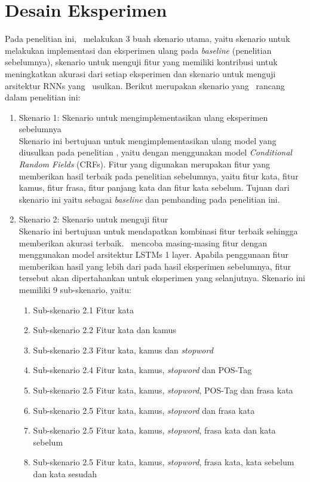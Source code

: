 \section{Desain Eksperimen}
Pada penelitian ini, \saya~melakukan 3 buah skenario utama, yaitu skenario untuk melakukan implementasi dan eksperimen ulang pada \textit{baseline} (penelitian sebelumnya), skenario untuk menguji fitur yang memiliki kontribusi untuk meningkatkan akurasi dari setiap eksperimen dan skenario untuk menguji arsitektur RNNs yang \saya~usulkan. Berikut merupakan skenario yang \saya~rancang dalam penelitian ini:
\begin{enumerate}
	\item Skenario 1: Skenario untuk mengimplementasikan ulang eksperimen sebelumnya\\
	Skenario ini bertujuan untuk mengimplementasikan ulang model yang diusulkan pada penelitian \cite{skripsiKakRadit}, yaitu dengan menggunakan model \textit{Conditional Random Fields} (CRFs). Fitur yang digunakan merupakan fitur yang memberikan hasil terbaik pada penelitian sebelumnya, yaitu fitur kata, fitur kamus, fitur frasa, fitur panjang kata dan fitur kata sebelum. Tujuan dari skenario ini yaitu sebagai \textit{baseline} dan pembanding pada penelitian ini.
	
	\item Skenario 2: Skenario untuk menguji fitur\\
	Skenario ini bertujuan untuk mendapatkan kombinasi fitur terbaik sehingga memberikan akurasi terbaik. \Saya~mencoba masing-masing fitur dengan menggunakan model arsitektur LSTMs 1 layer. Apabila penggunaan fitur memberikan hasil yang lebih dari pada hasil eksperimen sebelumnya, fitur tersebut akan dipertahankan untuk eksperimen yang selanjutnya. Skenario ini memiliki 9 sub-skenario, yaitu:
	\begin{enumerate}
		\item Sub-skenario 2.1 Fitur kata
		\item Sub-skenario 2.2 Fitur kata dan kamus
		\item Sub-skenario 2.3 Fitur kata, kamus dan \textit{stopword}
		\item Sub-skenario 2.4 Fitur kata, kamus, \textit{stopword} dan POS-Tag
		\item Sub-skenario 2.5 Fitur kata, kamus, \textit{stopword}, POS-Tag dan frasa kata
		\item Sub-skenario 2.5 Fitur kata, kamus, \textit{stopword} dan frasa kata
		\item Sub-skenario 2.5 Fitur kata, kamus, \textit{stopword}, frasa kata dan kata sebelum
		\item Sub-skenario 2.5 Fitur kata, kamus, \textit{stopword}, frasa kata, kata sebelum dan kata sesudah
	\end{enumerate}


\end{enumerate}
